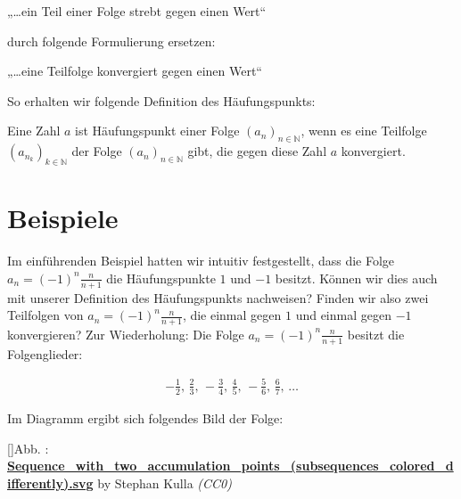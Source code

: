 \documentclass[fontsize=9pt,
               parskip=half-,
               DIV=14,
               listof=chapterentry,
               tocflat]{scrbook}
\newcounter{imagelabel}
\begin{document}
\begin{importantparagraph*}
„…ein Teil einer Folge strebt gegen einen Wert“

\end{importantparagraph*}

durch folgende Formulierung ersetzen:

\begin{importantparagraph*}
„…eine Teilfolge konvergiert gegen einen Wert“

\end{importantparagraph*}

So erhalten wir folgende Definition des Häufungspunkts:

\begin{definition*}
Eine Zahl $a$ ist Häufungspunkt einer Folge $(a_{n})_{n\in \mathbb {N} }$, wenn es eine Teilfolge $\left(a_{n_{k}}\right)_{k\in \mathbb {N} }$ der Folge $(a_{n})_{n\in \mathbb {N} }$ gibt, die gegen diese Zahl $a$ konvergiert.

\end{definition*}

\section{Beispiele}

Im einführenden Beispiel hatten wir intuitiv festgestellt, dass die Folge $a_{n}=(-1)^{n}{\tfrac {n}{n+1}}$ die Häufungspunkte $1$ und $-1$ besitzt. Können wir dies auch mit unserer Definition des Häufungspunkts nachweisen? Finden wir also zwei Teilfolgen von $a_{n}=(-1)^{n}{\tfrac {n}{n+1}}$, die einmal gegen $1$ und einmal gegen $-1$ konvergieren? Zur Wiederholung: Die Folge $a_{n}=(-1)^{n}{\tfrac {n}{n+1}}$ besitzt die Folgenglieder:

\begin{align*}
-{\tfrac {1}{2}},\,{\tfrac {2}{3}},\,-{\tfrac {3}{4}},\,{\tfrac {4}{5}},\,-{\tfrac {5}{6}},\,{\tfrac {6}{7}},\,\ldots 
\end{align*}

Im Diagramm ergibt sich folgendes Bild der Folge:

[]{Abb. : \protect\href{https://commons.wikimedia.org/wiki/File:Sequence_with_two_accumulation_points_(subsequences_colored_differently).svg}{\textbf{Sequence\allowbreak\_with\allowbreak\_two\allowbreak\_accumulation\allowbreak\_points\allowbreak\_(subsequences\allowbreak\_colored\allowbreak\_differently).svg}} by Stephan Kulla \textit{(CC0)}}\begin{center}
\end{center}
\end{document}
